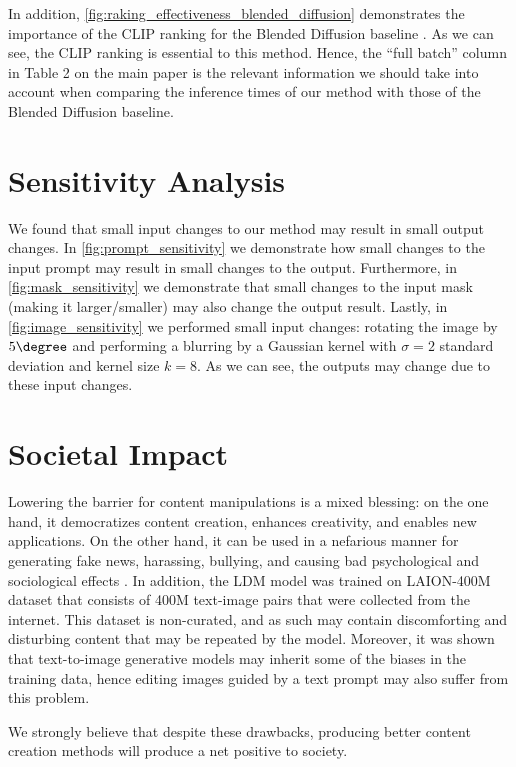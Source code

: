 \begin{appendix}
In addition, \ref{fig:raking_effectiveness_blended_diffusion} demonstrates the importance of the CLIP ranking for the Blended Diffusion baseline \cite{avrahami2022blended}. As we can see, the CLIP ranking is essential to this method. Hence, the ``full batch'' column in Table 2 on the main paper is the relevant information we should take into account when comparing the inference times of our method with those of the Blended Diffusion baseline.

\section{Sensitivity Analysis} We found that small input changes to our method may result in small output changes. In \ref{fig:prompt_sensitivity} we demonstrate how small changes to the input prompt may result in small changes to the output. Furthermore, in \ref{fig:mask_sensitivity} we demonstrate that small changes to the input mask (making it larger/smaller) may also change the output result. Lastly, in \ref{fig:image_sensitivity} we performed small input changes: rotating the image by $5 \degree$ and performing a blurring by a Gaussian kernel with $\sigma=2$ standard deviation and kernel size $k=8$. As we can see, the outputs may change due to these input changes.

\section{Societal Impact} Lowering the barrier for content manipulations is a mixed blessing: on the one hand, it democratizes content creation, enhances creativity, and enables new applications. On the other hand, it can be used in a nefarious manner for generating fake news, harassing, bullying, and causing bad psychological and sociological effects \cite{10.1145/3326601}. In addition, the LDM model was trained on LAION-400M dataset \cite{schuhmann2021laion} that consists of 400M text-image pairs that were collected from the internet. This dataset is non-curated, and as such may contain discomforting and disturbing content that may be repeated by the model. Moreover, it was shown \cite{nichol2021glide} that text-to-image generative models may inherit some of the biases in the training data, hence editing images guided by a text prompt may also suffer from this problem.

We strongly believe that despite these drawbacks, producing better content creation methods will produce a net positive to society.

\end{appendix}


